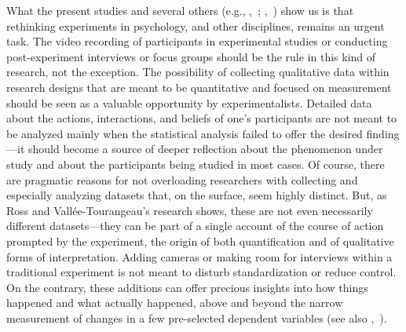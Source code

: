 \documentclass[twocolumn, serif, reflection, authordate]{jote-article}
\begin{document}
What the present studies and several others (e.g., ,~\citeyear{Glaveanu2019}; ,~\citeyear{Hawlina2019}) show us is that rethinking experiments in
psychology, and other disciplines, remains an urgent task. The video
recording of participants in experimental studies or conducting
post-experiment interviews or focus groups should be the rule in this
kind of research, not the exception. The possibility of collecting
qualitative data within research designs that are meant to be
quantitative and focused on measurement should be seen as a valuable
opportunity by experimentalists. Detailed data about the actions,
interactions, and beliefs of one's participants are not meant to be
analyzed mainly when the statistical analysis failed to offer the
desired finding---it should become a source of deeper reflection about
the phenomenon under study and about the participants being studied in
most cases. Of course, there are pragmatic reasons for not overloading
researchers with collecting and especially analyzing datasets that, on
the surface, seem highly distinct. But, as Ross and Vallée-Tourangeau's
research shows, these are not even necessarily different datasets---they
can be part of a single account of the course of action prompted by the
experiment, the origin of both quantification and of qualitative forms
of interpretation. Adding cameras or making room for interviews within a
traditional experiment is not meant to disturb standardization or reduce
control. On the contrary, these additions can offer precious insights
into how things happened and what actually happened, above and beyond
the narrow measurement of changes in a few pre-selected dependent
variables (see also ,~\citeyear{Glaveanu2019}).
\end{document}
